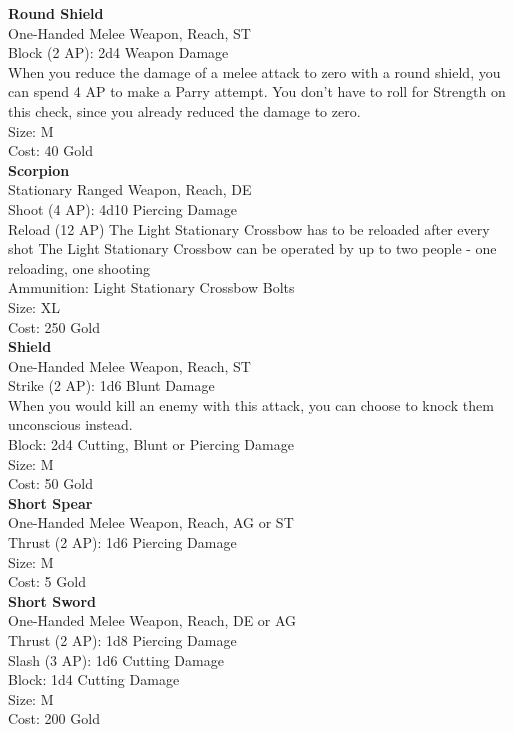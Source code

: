 \textbf{Round Shield}\\
One-Handed Melee Weapon,  Reach, ST\\
Block (2 AP): 2d4 Weapon Damage\\
When you reduce the damage of a melee attack to zero with a round shield, you can spend 4 AP to make a Parry attempt. You don't have to roll for Strength on this check, since you already reduced the damage to zero.\\
Size: M\\
Cost: 40 Gold\\


\textbf{Scorpion}\\
Stationary Ranged Weapon,  Reach, DE\\
Shoot (4 AP): 4d10 Piercing Damage\\
Reload (12 AP) The Light Stationary Crossbow has to be reloaded after every shot
The Light Stationary Crossbow can be operated by up to two people - one reloading, one shooting\\
Ammunition: Light Stationary Crossbow Bolts\\
Size: XL\\
Cost: 250 Gold\\


\textbf{Shield}\\
One-Handed Melee Weapon,  Reach, ST\\
Strike (2 AP): 1d6 Blunt Damage\\
When you would kill an enemy with this attack, you can choose to knock them unconscious instead.\\
Block: 2d4 Cutting, Blunt or Piercing Damage\\
Size: M\\
Cost: 50 Gold\\


\textbf{Short Spear}\\
One-Handed Melee Weapon,  Reach, AG or ST\\
Thrust (2 AP): 1d6 Piercing Damage\\
Size: M\\
Cost: 5 Gold\\


\textbf{Short Sword}\\
One-Handed Melee Weapon,  Reach, DE or AG\\
Thrust (2 AP): 1d8 Piercing Damage\\
Slash (3 AP): 1d6 Cutting Damage\\
Block: 1d4 Cutting Damage\\
Size: M\\
Cost: 200 Gold\\



